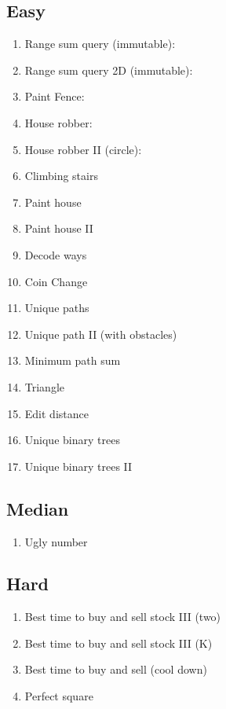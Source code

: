 \documentclass[DIV=calc, paper=a4, fontsize=11pt, twocolumn]{scrartcl}	 %
\begin{document}
\subsection*{Easy}
\begin{enumerate}
\item Range sum query (immutable): \cite{303}
\item Range sum query 2D (immutable): \cite{304}
\item Paint Fence: \cite{276} 
\item House robber: \cite{198} 
\item House robber II (circle): \cite{213} 
\item Climbing stairs \cite{070} 
\item Paint house \cite{256} 
\item Paint house II \cite{265} 
\item Decode ways \cite{091} 
\item Coin Change \cite{322} 
\item Unique paths \cite{062}
\item Unique path II (with obstacles) \cite{063}
\item Minimum path sum \cite{064} 
\item Triangle \cite{120}
\item Edit distance \cite{072}
\item Unique binary trees \cite{095} 
\item Unique binary trees II \cite{096} 
\end{enumerate}
\subsection*{Median} 
\begin{enumerate}
\item Ugly number
\end{enumerate}
\subsection*{Hard}
\begin{enumerate}
\item Best time to buy and sell stock III (two)
\item Best time to buy and sell stock III (K)
\item Best time to buy and sell (cool down)
\item Perfect square
\end{enumerate}

\end{document}

